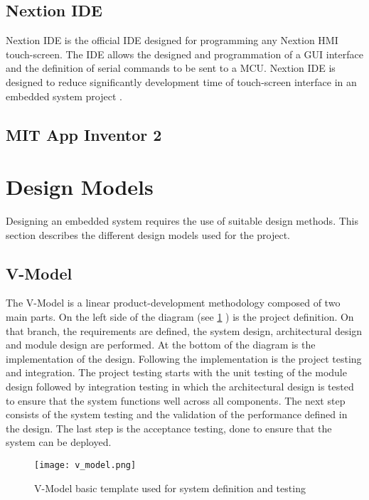 \subsection{Nextion IDE}
Nextion IDE is the official IDE designed for programming any Nextion HMI touch-screen. The IDE allows the designed and programmation of a GUI interface and the definition of serial commands to be sent to a MCU. Nextion IDE is designed to reduce significantly development time of touch-screen interface in an embedded system project \cite{nextion}. 

\subsection{MIT App Inventor 2}


\section{Design Models}
Designing an embedded system requires the use of suitable design methods. This section describes the different design models used for the project.

\subsection{V-Model}
The V-Model is a linear product-development methodology composed of two main parts. On the left side of the diagram (see \cref{fig:v_model} ) is the project definition. On that branch, the requirements are defined, the system design, architectural design and module design are performed. At the bottom of the diagram is the implementation of the design. Following the implementation is the project testing and integration. The project testing starts with the unit testing of the module design followed by integration testing in which the architectural design is tested to ensure that the system functions well across all components. The next step consists of the system testing and the validation of the performance defined in the design. The last step is the acceptance testing, done to ensure that the system can be deployed.       
\begin{figure}[ht]
\centering
\texttt{[image: v\_model.png]}
\caption{V-Model basic template used for system definition and testing}
\label{fig:v_model}
\end{figure}

